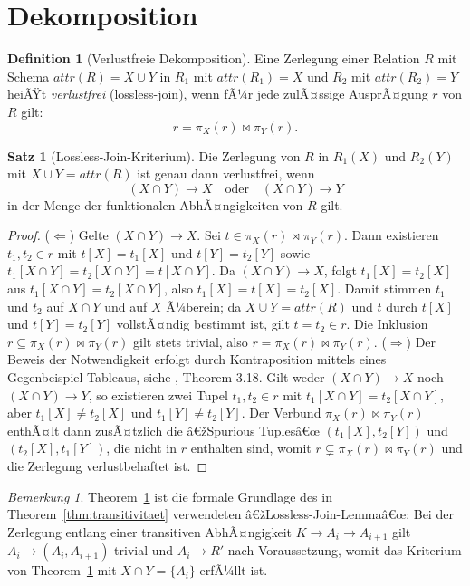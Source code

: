 ﻿\documentclass[a4paper,12pt]{report}
\theoremstyle{definition}
\newtheorem{definition}{Definition}[chapter]
\newtheorem{theorem}{Satz}[chapter]
\theoremstyle{remark}
\newtheorem{remark}{Bemerkung}[chapter]
\newcommand{\att}{\mathit{attr}}
\begin{document}
\section{Dekomposition}
\label{sec:dekomposition}

\begin{definition}[Verlustfreie Dekomposition]
\label{def:lossless}
Eine Zerlegung einer Relation $R$ mit Schema $\att(R)=X\cup Y$ in
$R_1$ mit $\att(R_1)=X$ und $R_2$ mit $\att(R_2)=Y$ heiÃŸt
\emph{verlustfrei} (lossless-join), wenn fÃ¼r jede zulÃ¤ssige
AusprÃ¤gung $r$ von $R$ gilt:
\[
  r = \pi_X(r) \Join \pi_Y(r).
\]
\end{definition}

\begin{theorem}[Lossless-Join-Kriterium]
\label{thm:lossless}
Die Zerlegung von $R$ in $R_1(X)$ und $R_2(Y)$ mit $X\cup Y=\att(R)$ ist
genau dann verlustfrei, wenn
\[
  (X\cap Y) \to X \quad\text{oder}\quad (X\cap Y) \to Y
\]
in der Menge der funktionalen AbhÃ¤ngigkeiten von $R$ gilt.
\end{theorem}

\begin{proof}
($\Leftarrow$) Gelte $(X\cap Y)\to X$. Sei $t \in
\pi_X(r)\Join\pi_Y(r)$. Dann existieren $t_1,t_2\in r$ mit
$t[X]=t_1[X]$ und $t[Y]=t_2[Y]$ sowie $t_1[X\cap Y]=t_2[X\cap Y]=t[X\cap
Y]$. Da $(X\cap Y)\to X$, folgt $t_1[X]=t_2[X]$ aus $t_1[X\cap
Y]=t_2[X\cap Y]$, also $t_1[X]=t[X]=t_2[X]$. Damit stimmen $t_1$ und
$t_2$ auf $X\cap Y$ und auf $X$ Ã¼berein; da $X\cup Y=\att(R)$ und $t$
durch $t[X]$ und $t[Y]=t_2[Y]$ vollstÃ¤ndig bestimmt ist, gilt $t=t_2\in
r$. Die Inklusion $r \subseteq \pi_X(r)\Join\pi_Y(r)$ gilt stets
trivial, also $r=\pi_X(r)\Join\pi_Y(r)$.
($\Rightarrow$) Der Beweis der Notwendigkeit erfolgt durch
Kontraposition mittels eines Gegenbeispiel-Tableaus, siehe
\cite{Ullman1988}, Theorem 3.18. Gilt weder $(X\cap Y)\to X$ noch
$(X\cap Y)\to Y$, so existieren zwei Tupel $t_1,t_2\in r$ mit
$t_1[X\cap Y]=t_2[X\cap Y]$, aber $t_1[X]\neq t_2[X]$ und $t_1[Y]\neq
t_2[Y]$. Der Verbund $\pi_X(r)\Join\pi_Y(r)$ enthÃ¤lt dann zusÃ¤tzlich die
â€žSpurious Tuplesâ€œ $(t_1[X],t_2[Y])$ und $(t_2[X],t_1[Y])$, die nicht in
$r$ enthalten sind, womit $r \subsetneq \pi_X(r)\Join\pi_Y(r)$ und die
Zerlegung verlustbehaftet ist. \qedhere
\end{proof}

\begin{remark}
Theorem~\ref{thm:lossless} ist die formale Grundlage des in
Theorem~\ref{thm:transitivitaet} verwendeten
â€žLossless-Join-Lemmaâ€œ: Bei der Zerlegung entlang einer transitiven
AbhÃ¤ngigkeit $K\to A_i\to A_{i+1}$ gilt $A_i \to (A_i,A_{i+1})$
trivial und $A_i \to R'$ nach Voraussetzung, womit das Kriterium von
Theorem~\ref{thm:lossless} mit $X\cap Y=\{A_i\}$ erfÃ¼llt ist.
\end{remark}
\end{document}
